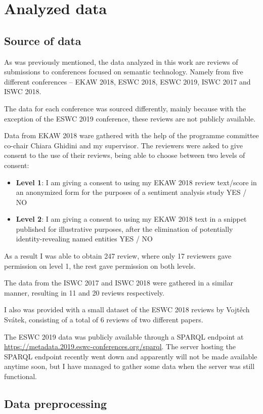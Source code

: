 \chapter{Analyzed data}
\section{Source of data}
As was previously mentioned, the data analyzed in this work are reviews of submissions to conferences focused on semantic technology. Namely from five different conferences --  EKAW 2018, ESWC 2018, ESWC 2019, ISWC 2017 and ISWC 2018.

The data for each conference was sourced differently, mainly because with the exception of the ESWC 2019 conference, these reviews are not publicly available.

Data from EKAW 2018 ware gathered with the help of the programme committee co-chair Chiara Ghidini and my supervisor. The reviewers were asked to give consent to the use of their reviews, being able to choose between two levels of consent:
\begin{itemize}
\item \textbf{Level 1}: I am giving a consent to using my EKAW 2018 review text/score in an anonymized form for the purposes of a sentiment analysis study      YES / NO
\item \textbf{Level 2}: I am giving a consent to using my EKAW 2018 text in a snippet published for illustrative purposes, after the elimination of potentially identity-revealing named entities      YES / NO
\end{itemize}

As a result I was able to obtain 247 review, where only 17 reviewers gave permission on level 1, the rest gave permission on both levels.

The data from the ISWC 2017 and ISWC 2018 were gathered in a similar manner, resulting in 11 and 20 reviews respectively.

I also was provided with a small dataset of the ESWC 2018 reviews by Vojtěch Svátek, consisting of a total of 6 reviews of two different papers.

The ESWC 2019 data was publicly available through a SPARQL endpoint at \url{https://metadata.2019.eswc-conferences.org/sparql}. The server hosting the SPARQL endpoint recently went down and apparently will not be made available anytime soon, but I have managed to gather some data when the server was still functional. 


\section{Data preprocessing}
